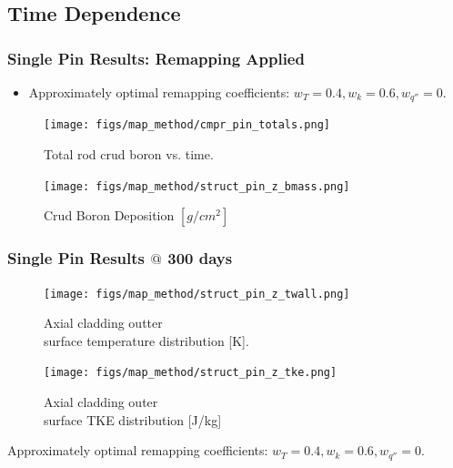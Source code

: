 \documentclass[t, pdftex]{beamer}
\begin{document}
\subsection*{Time Dependence}
\begin{frame}
\frametitle{Single Pin Results:  Remapping Applied}
\begin{itemize}
    \item Approximately optimal remapping coefficients: $w_T=0.4, w_k=0.6, w_{q''}=0$. 
\end{itemize}
    \begin{figure}
        \centering
        \begin{minipage}{.5\textwidth}
            \centering
            \texttt{[image: figs/map\_method/cmpr\_pin\_totals.png]}
            \caption{\centering Total rod crud boron vs. time.}
        \end{minipage}%
        \begin{minipage}{.5\textwidth}
            \centering
            \texttt{[image: figs/map\_method/struct\_pin\_z\_bmass.png]}
            \caption{ \centering Crud Boron Deposition $[g/cm^2]$}
        \end{minipage}
    \end{figure} 
\end{frame}

\begin{frame}
\frametitle{Single Pin Results $@$ 300 days}
    \begin{figure}
        \centering
        \begin{minipage}{.5\textwidth}
            \centering
            \texttt{[image: figs/map\_method/struct\_pin\_z\_twall.png]}
            \caption{Axial cladding outter \\ surface temperature distribution [K].}
        \end{minipage}%
        \begin{minipage}{.5\textwidth}
            \centering
            \texttt{[image: figs/map\_method/struct\_pin\_z\_tke.png]}
            \caption{ Axial cladding outer \\ surface TKE distribution [J/kg]}
        \end{minipage}
    \end{figure}
Approximately optimal remapping coefficients: $w_T=0.4, w_k=0.6, w_{q''}=0$.  
\end{frame}
\end{document}
